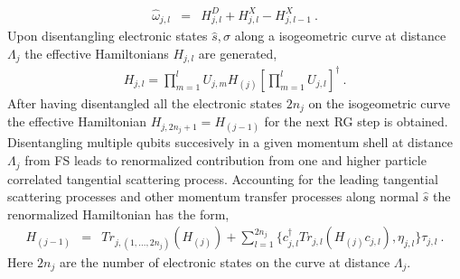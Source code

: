 \documentclass[aps,prl,preprint,groupedaddress]{revtex4-2}
\begin{document}
\begin{eqnarray}
\hat{\omega}_{j,l}&=&H^{D}_{j,l}+H^{X}_{j,l}-H^{X}_{j,l-1}~.\label{qfOp}
\end{eqnarray}
Upon disentangling electronic states $\hat{s},\sigma$ along a isogeometric curve at distance $\Lambda_{j}$ the effective Hamiltonians $H_{j,l}$ are generated,
\begin{eqnarray}
H_{j,l}=\prod_{m=1}^{l}U_{j,m}H_{(j)}[\prod_{m=1}^{l}U_{j,l}]^{\dagger}~.
\end{eqnarray}
After having disentangled all the electronic states $2n_{j}$ on the isogeometric curve the effective Hamiltonian $H_{j,2n_{j}+1}=H_{(j-1)}$ for the next RG step is obtained. Disentangling multiple qubits succesively in a given momentum shell at distance $\Lambda_{j}$ from FS leads to renormalized contribution from one and higher  particle correlated tangential scattering process. Accounting for the leading tangential scattering processes and other momentum transfer processes along normal $\hat{s}$ the renormalized Hamiltonian has the form,
\begin{eqnarray}
H_{(j-1)}&=&Tr_{j,(1,\ldots,2n_{j})}(H_{(j)})+\sum_{l=1}^{2n_{j}}\lbrace c^{\dagger}_{j,l}Tr_{j,l}(H_{(j)}c_{j,l}),\eta_{j,l}\rbrace\tau_{j,l}~.
\end{eqnarray}
Here $2n_{j}$ are the number of electronic states on the curve at distance $\Lambda_{j}$.
\end{document}
